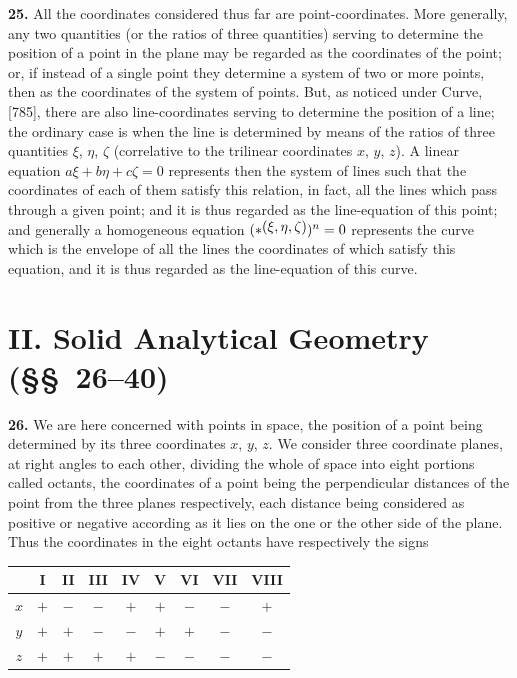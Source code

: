 \documentclass[11pt,a4paper]{book}
\begin{document}
\textbf{25.} All the coordinates considered thus far are point-coordinates. More generally, any two quantities (or the ratios of three quantities) serving to determine the position of a point in the plane may be regarded as the coordinates of the point; or, if instead of a single point they determine a system of two or more points, then as the coordinates of the system of points. But, as noticed under Curve, [785], there are also line-coordinates serving to determine the position of a line; the ordinary case is when the line is determined by means of the ratios of three quantities $\xi$, $\eta$, $\zeta$ (correlative to the trilinear coordinates $x$, $y$, $z$). A linear equation $a\xi+b\eta+c\zeta=0$ represents then the system of lines such that the coordinates of each of them satisfy this relation, in fact, all the lines which pass through a given point; and it is thus regarded as the line-equation of this point; and generally a homogeneous equation $(*\,\raisebox{0.5ex}{\text{$\!(\xi,\eta,\zeta)$}})^n=0$ represents the curve which is the envelope of all the lines the coordinates of which satisfy this equation, and it is thus regarded as the line-equation of this curve.

\section*{II. Solid Analytical Geometry (\S\S\ 26--40)}

\textbf{26.} We are here concerned with points in space, the position of a point being determined by its three coordinates $x$, $y$, $z$. We consider three coordinate planes, at right angles to each other, dividing the whole of space into eight portions called octants, the coordinates of a point being the perpendicular distances of the point from the three planes respectively, each distance being considered as positive or negative according as it lies on the one or the other side of the plane. Thus the coordinates in the eight octants have respectively the signs
\begin{center}
\begin{tabular}{c|cccccccc}
& I & II & III & IV & V & VI & VII & VIII \\
\hline
$x$ & $+$ & $-$ & $-$ & $+$ & $+$ & $-$ & $-$ & $+$ \\
$y$ & $+$ & $+$ & $-$ & $-$ & $+$ & $+$ & $-$ & $-$ \\
$z$ & $+$ & $+$ & $+$ & $+$ & $-$ & $-$ & $-$ & $-$ \\
\end{tabular}
\end{center}
\end{document}
